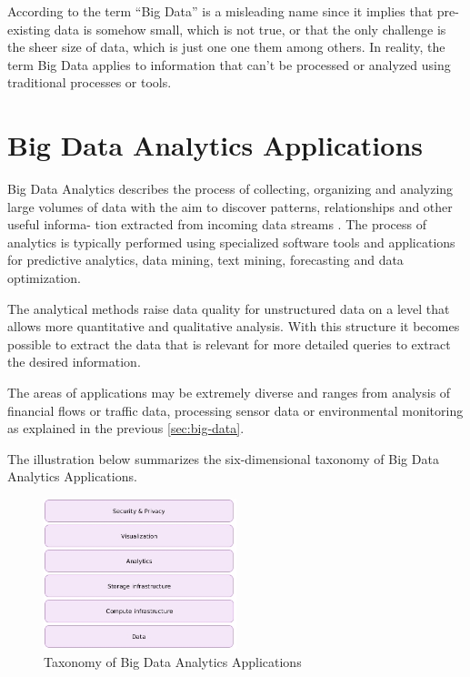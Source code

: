 According to \cite{Marz15} the term “Big Data” is a misleading name since it implies that
pre-existing data is somehow small, which is not true, or that the only challenge is the
sheer size of data, which is just one one them among others. In reality, the term Big Data
applies to information that can’t be processed or analyzed using traditional processes or
tools.

\section{Big Data Analytics Applications}
Big Data Analytics describes the process of collecting, organizing and analyzing large
volumes of data with the aim to discover patterns, relationships and other useful informa-
tion extracted from incoming data streams \cite{Marz15}. The process of analytics is typically
performed using specialized software tools and applications for predictive analytics, data
mining, text mining, forecasting and data optimization.

The analytical methods raise data quality for unstructured data on a level that allows
more quantitative and qualitative analysis. With this structure it becomes possible
to extract the data that is relevant for more detailed queries to extract the desired information.

The areas of applications may be extremely diverse and ranges from analysis of financial
flows or traffic data, processing sensor data or environmental monitoring as explained in
the previous \autoref{sec:big-data}.

The illustration below summarizes the six-dimensional taxonomy \cite{Bitk14, Csa14} of Big
Data Analytics Applications.
\begin{figure}[H]
	\centering
	\includegraphics[width=0.5\textwidth]{../images/05-big-data-taxonomy.jpg}
	\caption{Taxonomy of Big Data Analytics Applications \cite{Csa14}}
	\label{img:taxonomy-bigdata-applications}
\end{figure}

